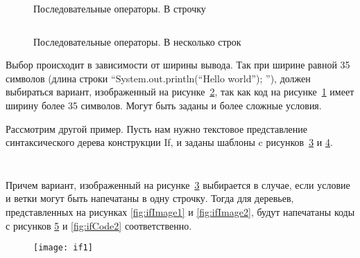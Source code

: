 \begin{figure}[h]
	\inputminted{c}{codes/seqCode1.java}
	\caption{Последовательные операторы. В строчку}
	\label{fig:seqCode1}
\end{figure}

\begin{figure}[h]
	\inputminted{c}{codes/seqCode2.java}
	\caption{Последовательные операторы. В несколько строк}
	\label{fig:seqCode2}
\end{figure}

Выбор происходит в зависимости от ширины вывода. Так при ширине равной 35 символов (длина строки “System.out.println(“Hello world”); ”), должен выбираться вариант, изображенный на рисунке~\ref{fig:seqCode2}, так как код на рисунке~\ref{fig:seqCode1} имеет ширину более 35 символов.
Могут быть заданы и более сложные условия.

\newpage

Рассмотрим другой пример. Пусть нам нужно текстовое представление синтаксического дерева конструкции If, и заданы шаблоны c рисунков~\ref{fig:ifTemplate1} и \ref{fig:ifTemplate2}.

\begin{figure}[h]
	\inputminted{haskell}{codes/ifTemplate1.hs}
	\caption{}
	\label{fig:ifTemplate1}
\end{figure}

\begin{figure}[h]
	\inputminted{haskell}{codes/ifTemplate2.hs}
	\caption{}
	\label{fig:ifTemplate2}
\end{figure}

Причем вариант, изображенный на рисунке~\ref{fig:ifTemplate1} выбирается в случае, если условие и ветки могут быть напечатаны в одну строчку. Тогда для деревьев, представленных на рисунках \ref{fig:ifImage1} и \ref{fig:ifImage2}, будут напечатаны коды с рисунков \ref{fig:ifCode1} и \ref{fig:ifCode2} соответственно.

\begin{figure}[h!]
	\begin{minipage}[b]{0.65\linewidth}
		\centering
		\texttt{[image: if1]}
		\caption{}
		\label{fig:ifImage1}
	\end{minipage}
	\hspace{0.5cm}
	\begin{minipage}[b]{0.25\linewidth}
		\centering
		\inputminted{haskell}{codes/ifCode1.hs}
		\caption{}
		\label{fig:ifCode1}
	\end{minipage}
\end{figure}

